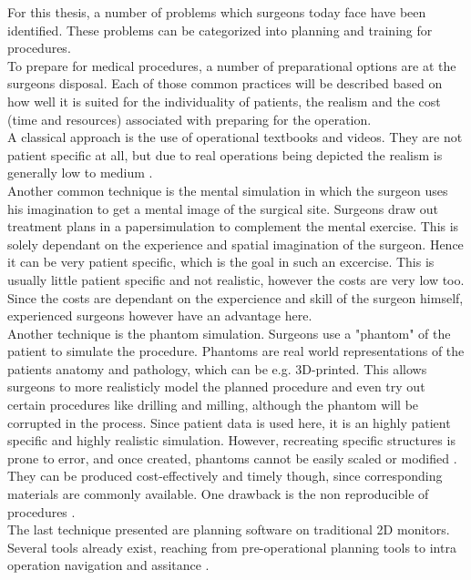 For this thesis, a number of problems which surgeons today face have been identified.
These problems can be categorized into planning and training for procedures.
\\ To prepare for medical procedures, a number of preparational options are at the surgeons disposal.
Each of those common practices will be described based on how well it is suited for the individuality of patients, the realism and the cost (time and resources) associated with preparing for the operation.
\\ A classical approach is the use of operational textbooks and videos.
They are not patient specific at all, but due to real operations being depicted the realism is generally low to medium \cite{Ellis.2005}.
\\ Another common technique is the mental simulation in which the surgeon uses his imagination to get a mental image of the surgical site.
Surgeons draw out treatment plans in a papersimulation to complement the mental exercise.
This is solely dependant on the experience and spatial imagination of the surgeon. 
Hence it can be very patient specific, which is the goal in such an excercise.
This is usually little patient specific and not realistic, however the costs are very low too.
Since the costs are dependant on the expercience and skill of the surgeon himself, experienced surgeons however have an advantage here.
\\ Another technique is the phantom simulation.
Surgeons use a "phantom" of the patient to simulate the procedure.
Phantoms are real world representations of the patients anatomy and pathology, which can be e.g. 3D-printed.
This allows surgeons to more realisticly model the planned procedure and even try out certain procedures like drilling and milling, although the phantom will be corrupted in the process.
Since patient data is used here, it is an highly patient specific and highly realistic simulation.
However, recreating specific structures is prone to error, and once created, phantoms cannot be easily scaled or modified \cite{TejoOtero.2020}.
\\ They can be produced cost-effectively and timely though, since corresponding materials are commonly available.
One drawback is the non reproducible of procedures \cite{richardson2015cost}.
\\ The last technique presented are planning software on traditional 2D monitors.
Several tools already exist, reaching from pre-operational planning tools to intra operation navigation and assitance \cite{HASSFELD20012}.
